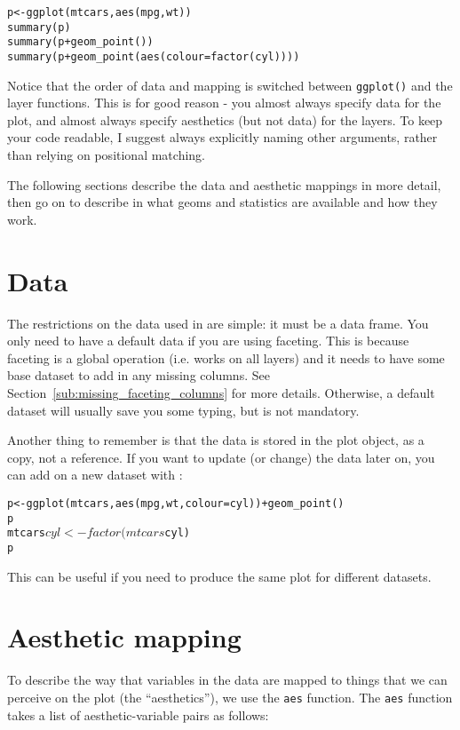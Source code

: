 \begin{alltt}
p <- ggplot(mtcars, aes(mpg, wt))
summary(p)
summary(p + geom_point())
summary(p + geom_point(aes(colour = factor(cyl))))
\end{alltt}

Notice that the order of data and mapping is switched between {\tt ggplot()} and the layer functions.  This is for good reason - you almost always specify data for the plot, and almost always specify aesthetics (but not data) for the layers.  To keep your code readable, I suggest always explicitly naming other arguments, rather than relying on positional matching.

The following sections describe the data and aesthetic mappings in more detail, then go on to describe in what geoms and statistics are available and how they work.

\section{Data}
\label{sec:data}

The restrictions on the data used in \ggplot are simple: it must be a data frame.  You only need to have a default data if you are using faceting.  This is because faceting is a global operation (i.e. works on all layers) and it needs to have some base dataset to add in any missing columns.  See Section~\ref{sub:missing_faceting_columns} for more details.  Otherwise, a default dataset will usually save you some typing, but is not mandatory.

Another thing to remember is that the data is stored in the plot object, as a copy, not a reference.  If you want to update (or change) the data later on, you can add on a new dataset with \code{\%+\%}:

\begin{alltt}
p <- ggplot(mtcars, aes(mpg, wt, colour = cyl)) + geom_point()
p
mtcars$cyl <- factor(mtcars$cyl)
p %+% mtcars
\end{alltt}

\noindent This can be useful if you need to produce the same plot for different datasets.

\section{Aesthetic mapping}
\label{sec:aes}

To describe the way that variables in the data are mapped to things that we can perceive on the plot (the ``aesthetics''), we use the {\tt aes} function.  The {\tt aes} function takes a list of aesthetic-variable pairs as follows:

